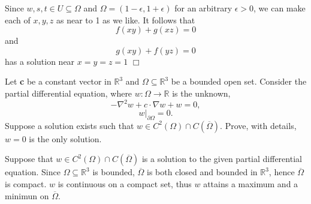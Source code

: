 \documentclass[11pt]{article}
\begin{document}
\noindent Since $w,s,t\in U\subseteq\Omega$ and $\Omega=(1-\epsilon,1+\epsilon)$ for an arbitrary $\epsilon>0$, we can make each of $x,y,z$ as near to 1 as we like. It follows that 
\[
f(xy)+g(xz)=0
\]
and
\[
g(xy)+f(yz)=0
\]
\noindent has a solution near $x=y=z=1$
\hfill $\Box$

\newpage

\noindent {\bf [4]} Let {\bf c} be a constant vector in $\mathbb{R}^3$ and $\Omega\subseteq\mathbb{R}^3$ be a bounded open set. Consider the partial differential equation, where $w:\Omega\rightarrow\mathbb{R}$ is the unknown,
\[
-\nabla ^2w+c\cdot\nabla w+w=0,
\]
\[
w|_{\partial\Omega}=0.
\]
\noindent Suppose a solution exists such that $w\in C^2(\Omega)\cap C(\overline{\Omega})$. Prove, with details, $w=0$ is the only solution.


\vspace{.1in}
\noindent [proof]

Suppose that $w\in C^2(\Omega)\cap C(\overline{\Omega})$ is a solution to the given partial differential equation. Since $\Omega\subseteq\mathbb{R}^3$ is bounded,  $\overline{\Omega}$ is both closed and bounded in $\mathbb{R}^3$, hence $\overline{\Omega}$ is compact. $w$ is continuous on a compact set, thus $w$ attains a maximum and a minimun on $\overline{\Omega}$.
\end{document}
